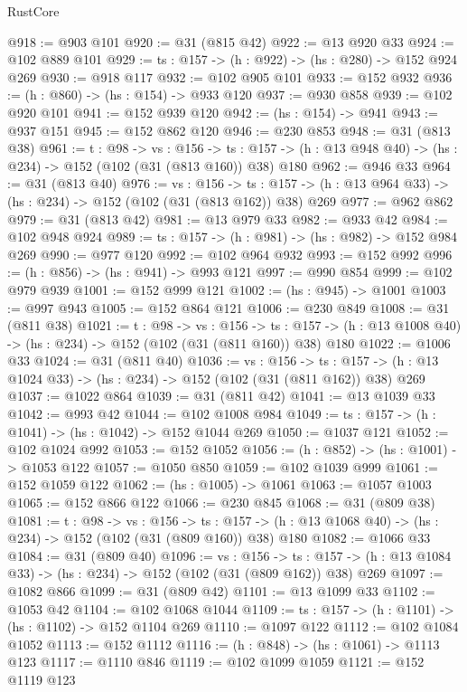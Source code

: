 \begin{lexlean}{RustCore}
\begin{coremodule}
@918 := @903 @101
@920 := @31 (@815 @42)
@922 := @13 @920 @33
@924 := @102 @889 @101
@929 := {ts : @157} -> (h : @922) -> (hs : @280) -> @152 @924 @269
@930 := @918 @117
@932 := @102 @905 @101
@933 := @152 @932
@936 := (h : @860) -> (hs : @154) -> @933 @120
@937 := @930 @858
@939 := @102 @920 @101
@941 := @152 @939 @120
@942 := (hs : @154) -> @941
@943 := @937 @151
@945 := @152 @862 @120
@946 := @230 @853
@948 := @31 (@813 @38)
@961 := {t : @98} ->
  {vs : @156} ->
  {ts : @157} -> (h : @13 @948 @40) -> (hs : @234) -> @152 (@102 (@31 (@813 @160)) @38) @180
@962 := @946 @33
@964 := @31 (@813 @40)
@976 := {vs : @156} ->
  {ts : @157} -> (h : @13 @964 @33) -> (hs : @234) -> @152 (@102 (@31 (@813 @162)) @38) @269
@977 := @962 @862
@979 := @31 (@813 @42)
@981 := @13 @979 @33
@982 := @933 @42
@984 := @102 @948 @924
@989 := {ts : @157} -> (h : @981) -> (hs : @982) -> @152 @984 @269
@990 := @977 @120
@992 := @102 @964 @932
@993 := @152 @992
@996 := (h : @856) -> (hs : @941) -> @993 @121
@997 := @990 @854
@999 := @102 @979 @939
@1001 := @152 @999 @121
@1002 := (hs : @945) -> @1001
@1003 := @997 @943
@1005 := @152 @864 @121
@1006 := @230 @849
@1008 := @31 (@811 @38)
@1021 := {t : @98} ->
  {vs : @156} ->
  {ts : @157} -> (h : @13 @1008 @40) -> (hs : @234) -> @152 (@102 (@31 (@811 @160)) @38) @180
@1022 := @1006 @33
@1024 := @31 (@811 @40)
@1036 := {vs : @156} ->
  {ts : @157} -> (h : @13 @1024 @33) -> (hs : @234) -> @152 (@102 (@31 (@811 @162)) @38) @269
@1037 := @1022 @864
@1039 := @31 (@811 @42)
@1041 := @13 @1039 @33
@1042 := @993 @42
@1044 := @102 @1008 @984
@1049 := {ts : @157} -> (h : @1041) -> (hs : @1042) -> @152 @1044 @269
@1050 := @1037 @121
@1052 := @102 @1024 @992
@1053 := @152 @1052
@1056 := (h : @852) -> (hs : @1001) -> @1053 @122
@1057 := @1050 @850
@1059 := @102 @1039 @999
@1061 := @152 @1059 @122
@1062 := (hs : @1005) -> @1061
@1063 := @1057 @1003
@1065 := @152 @866 @122
@1066 := @230 @845
@1068 := @31 (@809 @38)
@1081 := {t : @98} ->
  {vs : @156} ->
  {ts : @157} -> (h : @13 @1068 @40) -> (hs : @234) -> @152 (@102 (@31 (@809 @160)) @38) @180
@1082 := @1066 @33
@1084 := @31 (@809 @40)
@1096 := {vs : @156} ->
  {ts : @157} -> (h : @13 @1084 @33) -> (hs : @234) -> @152 (@102 (@31 (@809 @162)) @38) @269
@1097 := @1082 @866
@1099 := @31 (@809 @42)
@1101 := @13 @1099 @33
@1102 := @1053 @42
@1104 := @102 @1068 @1044
@1109 := {ts : @157} -> (h : @1101) -> (hs : @1102) -> @152 @1104 @269
@1110 := @1097 @122
@1112 := @102 @1084 @1052
@1113 := @152 @1112
@1116 := (h : @848) -> (hs : @1061) -> @1113 @123
@1117 := @1110 @846
@1119 := @102 @1099 @1059
@1121 := @152 @1119 @123

\end{coremodule}
\end{lexlean}
